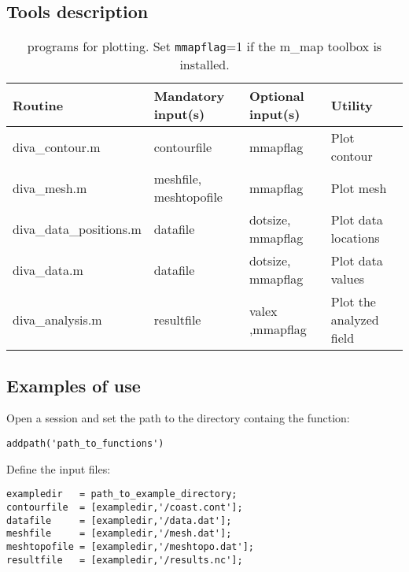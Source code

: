 \subsection{Tools description}
 
\begin{table}[htpb]
\centering
\caption[\matlab programs for plotting.]{\matlab programs for plotting. Set \texttt{mmapflag}=1 if the m\_map toolbox is installed.}
\begin{tabular*}{\textwidth}{@{\extracolsep{\fill}}llll}
\toprule
Routine				&	Mandatory input(s) 		&	Optional input(s)	& 	Utility  			\\
\midrule
diva\_contour.m 		&	contourfile 			& mmapflag 			&	Plot contour		\\
diva\_mesh.m 			& meshfile, meshtopofile 	& mmapflag 			&	Plot mesh			\\
diva\_data\_positions.m	& datafile 					& dotsize, mmapflag & 	Plot data locations	\\
diva\_data.m 			& datafile 					& dotsize, mmapflag & Plot data values		\\
diva\_analysis.m 		& resultfile 				& valex ,mmapflag 	 & Plot the analyzed field \\
\bottomrule
\end{tabular*}
\end{table}

\subsection{Examples of use}

Open a \matlab session and set the path to the directory containg the function:

\begin{lstlisting}[style=Matlab]
addpath('path_to_functions')
\end{lstlisting}

Define the input files:

\begin{lstlisting}[style=Matlab]
exampledir   = path_to_example_directory;
contourfile  = [exampledir,'/coast.cont'];
datafile     = [exampledir,'/data.dat'];
meshfile     = [exampledir,'/mesh.dat'];
meshtopofile = [exampledir,'/meshtopo.dat'];
resultfile   = [exampledir,'/results.nc'];
\end{lstlisting}


